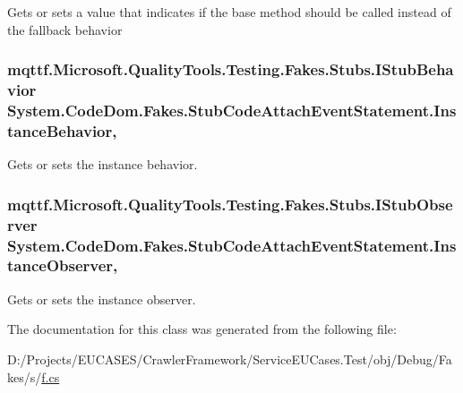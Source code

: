 Gets or sets a value that indicates if the base method should be called instead of the fallback behavior

\hypertarget{class_system_1_1_code_dom_1_1_fakes_1_1_stub_code_attach_event_statement_acab4c3af702a139d2d0eb6e4cadd3ae5}{
\subsubsection[{Instance\-Behavior}]{\setlength{\rightskip}{0pt plus 5cm}mqttf.\-Microsoft.\-Quality\-Tools.\-Testing.\-Fakes.\-Stubs.\-I\-Stub\-Behavior System.\-Code\-Dom.\-Fakes.\-Stub\-Code\-Attach\-Event\-Statement.\-Instance\-Behavior\hspace{0.3cm}{\ttfamily [get]}, {\ttfamily [set]}}}\label{class_system_1_1_code_dom_1_1_fakes_1_1_stub_code_attach_event_statement_acab4c3af702a139d2d0eb6e4cadd3ae5}


Gets or sets the instance behavior.

\hypertarget{class_system_1_1_code_dom_1_1_fakes_1_1_stub_code_attach_event_statement_a12fe160e1c6baa87db94668a1d0b787e}{
\subsubsection[{Instance\-Observer}]{\setlength{\rightskip}{0pt plus 5cm}mqttf.\-Microsoft.\-Quality\-Tools.\-Testing.\-Fakes.\-Stubs.\-I\-Stub\-Observer System.\-Code\-Dom.\-Fakes.\-Stub\-Code\-Attach\-Event\-Statement.\-Instance\-Observer\hspace{0.3cm}{\ttfamily [get]}, {\ttfamily [set]}}}\label{class_system_1_1_code_dom_1_1_fakes_1_1_stub_code_attach_event_statement_a12fe160e1c6baa87db94668a1d0b787e}


Gets or sets the instance observer.



The documentation for this class was generated from the following file\-:\begin{DoxyCompactItemize}
\item 
D\-:/\-Projects/\-E\-U\-C\-A\-S\-E\-S/\-Crawler\-Framework/\-Service\-E\-U\-Cases.\-Test/obj/\-Debug/\-Fakes/s/\hyperlink{s_2f_8cs}{f.\-cs}\end{DoxyCompactItemize}
